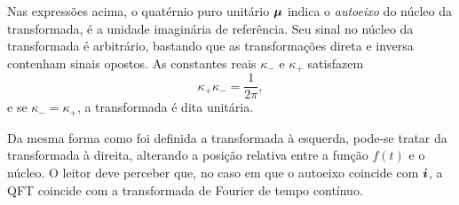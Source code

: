 Nas express\~oes acima, o quat\'ernio puro unit\'ario $\boldsymbol{\mu}$ indica o \emph{autoeixo} do n\'ucleo da transformada, \'e a unidade imagin\'aria de refer\^encia. Seu sinal no n\'ucleo da transformada \'e arbitr\'ario, bastando que as transforma\c c\~oes direta e inversa contenham sinais opostos. As constantes reais $\kappa_{-}$ e $\kappa_{+}$ satisfazem
\begin{equation}
\kappa_{+} \kappa_{-} = \frac{1}{2\pi},
\end{equation}
\noindent e se $\kappa_{-} = \kappa_{+}$, a transformada \'e dita unit\'aria.

%
%
%
%
%
%

Da mesma forma como foi definida a transformada \`a esquerda, pode-se tratar da transformada \`a direita, alterando a posi\c c\~ao relativa entre a fun\c c\~ao $ f(t) $ e o n\'ucleo. O leitor deve perceber que, no caso em que o autoeixo coincide com $ \boldsymbol{i} $, a QFT coincide com a transformada de Fourier de tempo
cont\'inuo.

